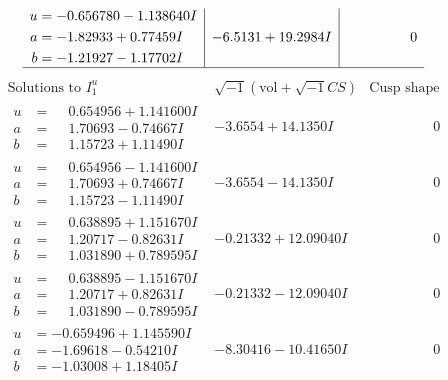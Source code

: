 \documentclass[1p]{elsarticle_modified}
\theoremstyle{definition}
\newcommand{\I}{\sqrt{-1}}
\begin{document}
$$\begin{array}{c|c|c}
\begin{aligned}
u &= -0.656780 - 1.138640 I \\
a &= -1.82933 + 0.77459 I \\
b &= -1.21927 - 1.17702 I\end{aligned}
 & -6.5131 + 19.2984 I & \phantom{-0.000000 } 0\\
 \hline 
 \end{array}$$\newpage$$\begin{array}{c|c|c}  
\text{Solutions to }I^u_{1}& \I (\text{vol} + \sqrt{-1}CS) & \text{Cusp shape}\\
 \hline 
\begin{aligned}
u &= \phantom{-}0.654956 + 1.141600 I \\
a &= \phantom{-}1.70693 - 0.74667 I \\
b &= \phantom{-}1.15723 + 1.11490 I\end{aligned}
 & -3.6554 + 14.1350 I & \phantom{-0.000000 } 0 \\ \hline\begin{aligned}
u &= \phantom{-}0.654956 - 1.141600 I \\
a &= \phantom{-}1.70693 + 0.74667 I \\
b &= \phantom{-}1.15723 - 1.11490 I\end{aligned}
 & -3.6554 - 14.1350 I & \phantom{-0.000000 } 0 \\ \hline\begin{aligned}
u &= \phantom{-}0.638895 + 1.151670 I \\
a &= \phantom{-}1.20717 - 0.82631 I \\
b &= \phantom{-}1.031890 + 0.789595 I\end{aligned}
 & -0.21332 + 12.09040 I & \phantom{-0.000000 } 0 \\ \hline\begin{aligned}
u &= \phantom{-}0.638895 - 1.151670 I \\
a &= \phantom{-}1.20717 + 0.82631 I \\
b &= \phantom{-}1.031890 - 0.789595 I\end{aligned}
 & -0.21332 - 12.09040 I & \phantom{-0.000000 } 0 \\ \hline\begin{aligned}
u &= -0.659496 + 1.145590 I \\
a &= -1.69618 - 0.54210 I \\
b &= -1.03008 + 1.18405 I\end{aligned}
 & -8.30416 - 10.41650 I & \phantom{-0.000000 } 0 \\ \hline\begin{aligned}

\end{aligned}
\end{array}$$
\end{document}
